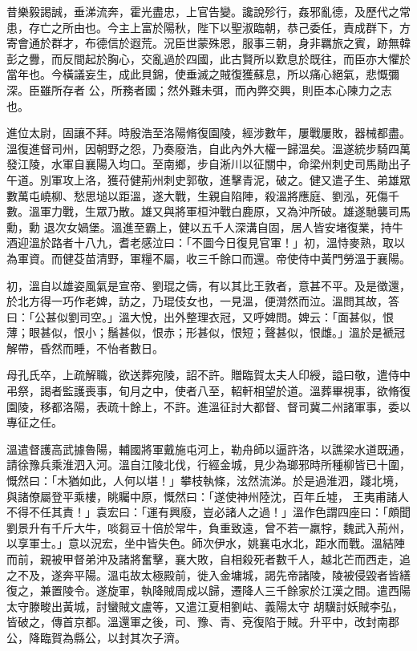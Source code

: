 \begin{pinyinscope}
 昔樂毅謁誠，垂涕流奔，霍光盡忠，上官告變。讒說殄行，姦邪亂德，及歷代之常患，存亡之所由也。今主上富於陽秋，陛下以聖淑臨朝，恭己委任，責成群下，方寄會通於群才，布德信於遐荒。況臣世蒙殊恩，服事三朝，身非羈旅之賓，跡無韓彭之釁，而反間起於胸心，交亂過於四國，此古賢所以歎息於既往，而臣亦大懼於當年也。今橫議妄生，成此貝錦，使垂滅之賊復獲蘇息，所以痛心絕氣，悲慨彌深。臣雖所存者
 公，所務者國；然外難未弭，而內弊交興，則臣本心陳力之志也。



 進位太尉，固讓不拜。時殷浩至洛陽脩復園陵，經涉數年，屢戰屢敗，器械都盡。溫復進督司州，因朝野之怨，乃奏廢浩，自此內外大權一歸溫矣。溫遂統步騎四萬發江陵，水軍自襄陽入均口。至南鄉，步自淅川以征關中，命梁州刺史司馬勛出子午道。別軍攻上洛，獲苻健荊州刺史郭敬，進擊青泥，破之。健又遣子生、弟雄眾數萬屯嶢柳、愁思塠以距溫，遂大戰，生親自陷陣，殺溫將應庭、劉泓，死傷千數。溫軍力戰，生眾乃散。雄又與將軍桓沖戰白鹿原，又為沖所破。雄遂馳襲司馬勳，勳
 退次女媧堡。溫進至霸上，健以五千人深溝自固，居人皆安堵復業，持牛酒迎溫於路者十八九，耆老感泣曰：「不圖今日復見官軍！」初，溫恃麥熟，取以為軍資。而健芟苗清野，軍糧不屬，收三千餘口而還。帝使侍中黃門勞溫于襄陽。



 初，溫自以雄姿風氣是宣帝、劉琨之儔，有以其比王敦者，意甚不平。及是徵還，於北方得一巧作老婢，訪之，乃琨伎女也，一見溫，便潸然而泣。溫問其故，答曰：「公甚似劉司空。」溫大悅，出外整理衣冠，又呼婢問。婢云：「面甚似，恨薄；眼甚似，恨小；鬚甚似，恨赤；形甚似，恨短；聲甚似，恨雌。」溫於是褫冠解帶，昏然而睡，不怡者數日。



 母孔氏卒，上疏解職，欲送葬宛陵，詔不許。贈臨賀太夫人印綬，謚曰敬，遣侍中弔祭，謁者監護喪事，旬月之中，使者八至，軺軒相望於道。溫葬畢視事，欲脩復園陵，移都洛陽，表疏十餘上，不許。進溫征討大都督、督司冀二州諸軍事，委以專征之任。



 溫遣督護高武據魯陽，輔國將軍戴施屯河上，勒舟師以逼許洛，以譙梁水道既通，請徐豫兵乘淮泗入河。溫自江陵北伐，行經金城，見少為瑯邪時所種柳皆已十圍，慨然曰：「木猶如此，人何以堪！」攀枝執條，泫然流涕。於是過淮泗，踐北境，與諸僚屬登平乘樓，眺矚中原，慨然曰：「遂使神州陸沈，百年丘墟，
 王夷甫諸人不得不任其責！」袁宏曰：「運有興廢，豈必諸人之過！」溫作色謂四座曰：「頗聞劉景升有千斤大牛，啖芻豆十倍於常牛，負重致遠，曾不若一羸牸，魏武入荊州，以享軍士。」意以況宏，坐中皆失色。師次伊水，姚襄屯水北，距水而戰。溫結陣而前，親被甲督弟沖及諸將奮擊，襄大敗，自相殺死者數千人，越北芒而西走，追之不及，遂奔平陽。溫屯故太極殿前，徙入金墉城，謁先帝諸陵，陵被侵毀者皆繕復之，兼置陵令。遂旋軍，執降賊周成以歸，遷降人三千餘家於江漢之間。遣西陽太守滕畯出黃城，討蠻賊文盧等，又遣江夏相劉岵、義陽太守
 胡驥討妖賊李弘，皆破之，傳首京都。溫還軍之後，司、豫、青、兗復陷于賊。升平中，改封南郡公，降臨賀為縣公，以封其次子濟。




\end{pinyinscope}
